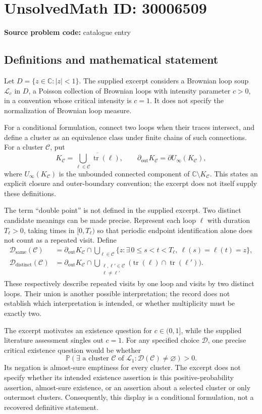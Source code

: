 \documentclass[11pt]{article}
\newcommand{\C}{\mathbb{C}}
\begin{document}
\section*{UnsolvedMath ID: 30006509}
\textbf{Source problem code:} catalogue entry
\subsection{Definitions and mathematical statement}
Let \(D=\{z\in\C:|z|<1\}\). The supplied excerpt considers a Brownian loop soup \(\mathcal L_c\) in \(D\), a Poisson collection of Brownian loops with intensity parameter \(c>0\), in a convention whose critical intensity is \(c=1\). It does not specify the normalization of Brownian loop measure.

For a conditional formulation, connect two loops when their traces intersect, and define a cluster as an equivalence class under finite chains of such connections. For a cluster \(\mathcal C\), put
\[
K_{\mathcal C}=\overline{\bigcup_{\ell\in\mathcal C}\operatorname{tr}(\ell)},\qquad
\partial_{\mathrm{out}}K_{\mathcal C}=\partial U_\infty(K_{\mathcal C}),
\]
where \(U_\infty(K_{\mathcal C})\) is the unbounded connected component of \(\C\setminus K_{\mathcal C}\). This states an explicit closure and outer-boundary convention; the excerpt does not itself supply these definitions.

The term ``double point'' is not defined in the supplied excerpt. Two distinct candidate meanings can be made precise. Represent each loop \(\ell\) with duration \(T_\ell>0\), taking times in \([0,T_\ell)\) so that periodic endpoint identification alone does not count as a repeated visit. Define
\[
\begin{aligned}
\mathcal D_{\mathrm{same}}(\mathcal C)
&=\partial_{\mathrm{out}}K_{\mathcal C}\cap
\bigcup_{\ell\in\mathcal C}
\{z:\exists\,0\le s<t<T_\ell,\ \ell(s)=\ell(t)=z\},\\
\mathcal D_{\mathrm{distinct}}(\mathcal C)
&=\partial_{\mathrm{out}}K_{\mathcal C}\cap
\bigcup_{\substack{\ell,\ell'\in\mathcal C\\\ell\ne\ell'}}
\bigl(\operatorname{tr}(\ell)\cap\operatorname{tr}(\ell')\bigr).
\end{aligned}
\]
These respectively describe repeated visits by one loop and visits by two distinct loops. Their union is another possible interpretation; the record does not establish which interpretation is intended, or whether multiplicity must be exactly two.

The excerpt motivates an existence question for \(c\in(0,1]\), while the supplied literature assessment singles out \(c=1\). For any specified choice \(\mathcal D\), one precise critical existence question would be whether
\[
\mathbb P\!\left(\exists\text{ a cluster }\mathcal C\text{ of }\mathcal L_1:
\mathcal D(\mathcal C)\ne\varnothing\right)>0.
\]
Its negation is almost-sure emptiness for every cluster. The excerpt does not specify whether its intended existence assertion is this positive-probability assertion, almost-sure existence, or an assertion about a selected cluster or only outermost clusters. Consequently, this display is a conditional formulation, not a recovered definitive statement.
\end{document}
